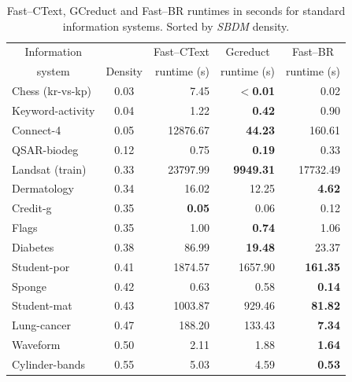 \documentclass[authoryear,preprint,review,12pt]{elsarticle}
\begin{document}
	\begin{table}[htb]
		\centering
		\caption{Fast--CText, GCreduct and Fast--BR runtimes in seconds for standard information systems. Sorted by \textit{SBDM} density.}
		\label{tab:density}
		\begin{tabular}{|l|c|r|r|r|}
			\hline
			\multicolumn{1}{|c|}{Information}  && Fast--CText & \multicolumn{1}{c|}{Gcreduct} & \multicolumn{1}{c|}{Fast--BR}  \\
			\multicolumn{1}{|c|}{system}       & Density & runtime (s) & runtime (s)  & runtime (s)  \\
			\hline
			Chess (kr-vs-kp)          & 0.03    & 7.45          & \textbf{$<$0.01} & 0.02            \\
			Keyword-activity          & 0.04    & 1.22          & \textbf{0.42}    & 0.90            \\
			Connect-4                 & 0.05    & 12876.67      & \textbf{44.23}   & 160.61          \\
			QSAR-biodeg               & 0.12    & 0.75          & \textbf{0.19}    & 0.33            \\
			Landsat (train)           & 0.33    & 23797.99      & \textbf{9949.31} & 17732.49        \\
			Dermatology               & 0.34    & 16.02         & 12.25            & \textbf{4.62}   \\
			Credit-g                  & 0.35    & \textbf{0.05} & 0.06             & 0.12            \\
			Flags                     & 0.35    & 1.00          & \textbf{0.74}    & 1.06            \\
			Diabetes                  & 0.38    & 86.99         & \textbf{19.48}   & 23.37           \\
			Student-por               & 0.41    & 1874.57       & 1657.90          & \textbf{161.35} \\
			Sponge                    & 0.42    & 0.63          & 0.58             & \textbf{0.14}   \\
			Student-mat               & 0.43    & 1003.87       & 929.46           & \textbf{81.82}  \\
			Lung-cancer               & 0.47    & 188.20        & 133.43           & \textbf{7.34}   \\
			Waveform                  & 0.50    & 2.11          & 1.88             & \textbf{1.64}   \\
			Cylinder-bands            & 0.55    & 5.03          & 4.59             & \textbf{0.53}   \\
			\hline
		\end{tabular}
	\end{table}
	
\end{document}
